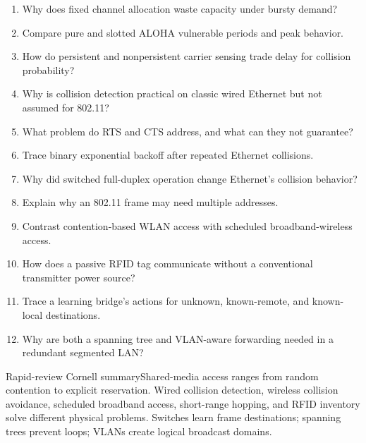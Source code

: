 \documentclass[10pt,letterpaper]{article}
\begin{document}

\begin{enumerate}
  \item Why does fixed channel allocation waste capacity under bursty demand?
  \item Compare pure and slotted ALOHA vulnerable periods and peak behavior.
  \item How do persistent and nonpersistent carrier sensing trade delay for collision probability?
  \item Why is collision detection practical on classic wired Ethernet but not assumed for 802.11?
  \item What problem do RTS and CTS address, and what can they not guarantee?
  \item Trace binary exponential backoff after repeated Ethernet collisions.
  \item Why did switched full-duplex operation change Ethernet's collision behavior?
  \item Explain why an 802.11 frame may need multiple addresses.
  \item Contrast contention-based WLAN access with scheduled broadband-wireless access.
  \item How does a passive RFID tag communicate without a conventional transmitter power source?
  \item Trace a learning bridge's actions for unknown, known-remote, and known-local destinations.
  \item Why are both a spanning tree and VLAN-aware forwarding needed in a redundant segmented LAN?
\end{enumerate}
\begin{CornellSummaryBox}{Rapid-review Cornell summary}Shared-media access ranges from random contention to explicit reservation. Wired collision detection, wireless collision avoidance, scheduled broadband access, short-range hopping, and RFID inventory solve different physical problems. Switches learn frame destinations; spanning trees prevent loops; VLANs create logical broadcast domains.\end{CornellSummaryBox}
\end{document}
